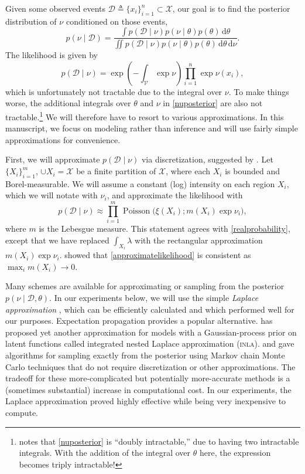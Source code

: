 \documentclass{article}
\newcommand{\deq}{\triangleq}
\newcommand{\cm}[1]{\mathcal{#1}}
\newcommand{\data}{\cm{D}}
\newcommand{\given}{\mid}
\newcommand{\intd}[1]{\,\mathrm{d}#1}
\DeclareMathOperator{\poisson}{Poisson}
\begin{document}
Given some observed events $\data \deq \lbrace x_i \rbrace_{i=1}^n
\subset \cm{X}$, our goal is to find the posterior distribution of
$\nu$ conditioned on those events,
\begin{equation}
  \label{nuposterior}
  p(\nu \given \data)
  =
  \frac
  {
    \int p(\data \given \nu)
    p(\nu \given \theta)
    p(\theta) \intd{\theta}
  }
  {
    \iint p(\data \given \nu)
    p(\nu \given \theta) 
    p(\theta) 
    \intd{\theta} \intd{\nu}
  }.
\end{equation}
The likelihood is given by
\begin{equation}
  \label{hard}
  p(\data \given \nu) 
  =
  \exp\left( -\int_{\cm{V}} \exp \nu \right) \prod_{i = 1}^n \exp \nu(x_i),
\end{equation}
which is unfortunately not tractable due to the integral over $\nu$.
To make things worse, the additional integrals over $\theta$ and $\nu$
in \eqref{nuposterior} are also not tractable.\footnote{\citep{adams}
  notes that \eqref{nuposterior} is ``doubly intractable,'' due to
  having two intractable integrals.  With the addition of the integral
  over $\theta$ here, the expression becomes triply intractable!}  We
will therefore have to resort to various approximations.  In this
manuscript, we focus on modeling rather than inference and will use
fairly simple approximations for convenience.

First, we will approximate $p(\data \given \nu)$ via discretization,
suggested by \citet{moller}.  Let $\lbrace X_i \rbrace_{i=1}^m$, $\cup
X_i = \cm{X}$ be a finite partition of $\cm{X}$, where each $X_i$ is
bounded and Borel-measurable. We will assume a constant (log)
intensity on each region $X_i$, which we will notate with $\nu_i$, and
approximate the likelihood with
\begin{equation}
  \label{approximatelikelihood}
  p(\data \given \nu) 
  \approx
  \prod_{i=1}^m
  \poisson\bigl(\xi(X_i); m(X_i) \exp \nu_i\bigr),
\end{equation}
where $m$ is the Lebesgue measure.  This statement agrees with
\eqref{realprobability}, except that we have replaced $\int_{X_i}
\lambda$ with the rectangular approximation $m(X_i) \exp \nu_i$.
\citet{ghosh} showed that \eqref{approximatelikelihood} is consistent
as $\max_i m(X_i) \to 0$.

Many schemes are available for approximating or sampling from the
posterior $p(\nu \given \data, \theta)$.  In our experiments below, we
will use the simple \emph{Laplace approximation}
\citep{williamsbarber}, which can be efficiently calculated and which
performed well for our purposes.  Expectation propagation
\citep{minka} provides a popular alternative.  \citet{inla} has
proposed yet another approximation for models with a Gaussian-process
prior on latent functions called integrated nested Laplace
approximation (\textsc{inla}). \citet{adams} and \citet{ess} gave
algorithms for sampling exactly from the posterior using Markov chain
Monte Carlo techniques that do not require discretization or other
approximations.  The tradeoff for these more-complicated but
potentially more-accurate methods is a (sometimes substantial)
increase in computational cost.  In our experiments, the Laplace
approximation proved highly effective while being very inexpensive to
compute.
\end{document}
